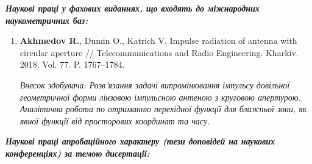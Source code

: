 \begin{center} 
\textit{\textbf{Наукові праці у фахових виданнях, що входять до 
міжнародних наукометричних баз:}}
\end{center}

\begin{enumerate}
\setcounter{enumi}{\value{ItemsInMyWriting}}

\item \textbf{Akhmedov R.}, Dumin O., Katrich V. Impulse radiation of antenna 
with circular aperture // Telecommunications and Radio Engineering. Kharkiv. 
2018. Vol. 77. P. 1767--1784.

\textit{Внесок здобувача: Розв'язання задачі випромінювання імпульсу довільної
геометричної форми лінзовою імпульсною антеною з круговою апертурою. Аналітична
робота по отриманню перехідної функції для ближньої зони, як явної функції 
від просторових координат та часу.}

\setcounter{ItemsInMyWriting}{\value{enumi}}
\end{enumerate}


\begin{center} 
\textit{\textbf{Наукові праці апробаційного характеру (тези доповідей на 
наукових конференціях) за темою дисертації:}}
\end{center}

